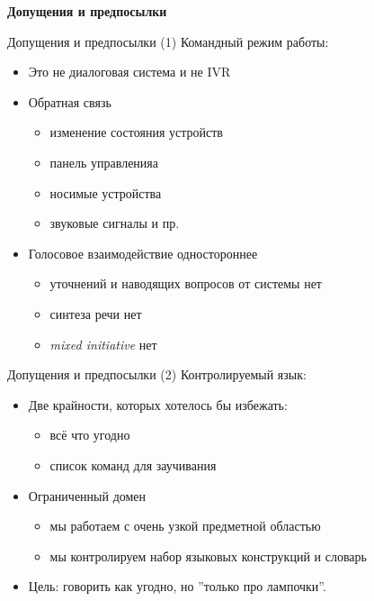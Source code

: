 \documentclass{beamer}
\begin{document}
\begin{frame}{}
\begin{center}
	\textbf{Допущения и предпосылки}\\
\end{center}
\end{frame}

\begin{frame}{Допущения и предпосылки (1)}
Командный режим работы:\\
\bigskip
\begin{itemize}
	\item Это не диалоговая система и не IVR
	\item Обратная связь
		\begin{itemize}
			\item изменение состояния устройств 
			\item панель управленияа
			\item носимые устройства 
			\item звуковые сигналы и пр.
		\end{itemize}
	\item Голосовое взаимодействие одностороннее
		\begin{itemize}
			\item уточнений и наводящих вопросов от системы нет
			\item синтеза речи нет
			\item \textit{mixed initiative} нет
		\end{itemize}
\end{itemize}
\end{frame}

\begin{frame}{Допущения и предпосылки (2)}
Контролируемый язык:\\
\bigskip
\begin{itemize}
	\item Две крайности, которых хотелось бы избежать:
		\begin{itemize}
			\item всё что угодно 
			\item список команд для заучивания
		\end{itemize}
	\item Ограниченный домен
		\begin{itemize}
			\item мы работаем с очень узкой предметной областью
			\item мы контролируем набор языковых конструкций и словарь
		\end{itemize}
	\item Цель: говорить как угодно, но ''только про лампочки''.
\end{itemize}
\end{frame}
\end{document}

